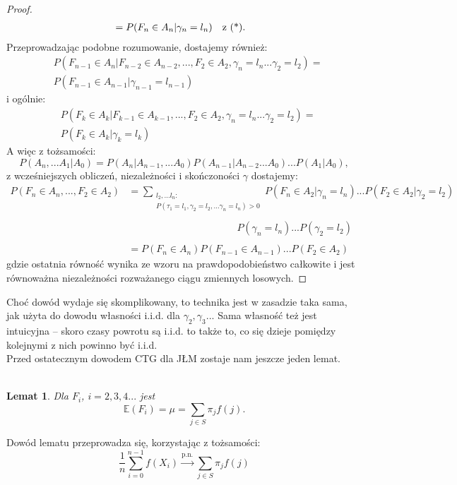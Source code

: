 \documentclass[a4paper]{article}
\theoremstyle{defn}
\theoremstyle{theorem}
\theoremstyle{lemma}
\newtheorem{lemma}[defn]{Lemat}
\theoremstyle{cor}
\theoremstyle{fact}
\begin{document}
\begin{proof}
\begin{align*}
    &= P(F_n \in A_n | \gamma_n = l_n) \text{\quad z (*).}
\end{align*}
Przeprowadzając podobne rozumowanie, dostajemy również:
\begin{align*}
&P(F_{n-1} \in A_n|F_{n-2} \in A_{n-2},  ..., F_2 \in A_2, \gamma_n = l_n ... \gamma_2 = l_2) =\\ & P(F_{n-1} \in A_{n-1} | \gamma_{n-1} = l_{n-1})
\end{align*}
i ogólnie:
\begin{align*}
&P(F_{k} \in A_k|F_{k-1} \in A_{k-1},  ..., F_2 \in A_2, \gamma_n = l_n ... \gamma_2 = l_2) =\\ & P(F_{k} \in A_{k} | \gamma_{k} = l_{k})
\end{align*}
A więc z tożsamości:
$$P(A_n, ... A_1|A_0) = P(A_n|A_{n-1}, ...A_0)P(A_{n-1}|A_{n-2}...A_0)...P(A_1|A_0),$$
z wcześniejszych obliczeń, niezależności i skończoności $\gamma$ dostajemy:
\begin{align*}
    P(F_n \in A_n, ..., F_2 \in A_2) &= \sum\limits_{\substack{l_2, ... l_n:\\P(\tau_1 = l_1, \gamma_2 = l_2, ... \gamma_n = l_n) > 0}} P(F_n \in A_2|\gamma_n = l_n) ... P(F_2 \in A_2|\gamma_2 = l_2)\\\\
    &\quad\quad\quad\quad\quad\quad\quad\quad\quad\quad\quad P(\gamma_n = l_n) ... P(\gamma_2 = l_2)\\\\
    &= P(F_n \in A_n)P(F_{n-1} \in A_{n-1}) ... P(F_2 \in A_2)
\end{align*}
gdzie ostatnia równość wynika ze wzoru na prawdopodobieństwo całkowite i jest równoważna niezależności rozważanego ciągu zmiennych losowych. 
\end{proof}
Choć dowód wydaje się skomplikowany, to technika jest w zasadzie taka sama, jak użyta do dowodu własności i.i.d. dla $\gamma_2, \gamma_3 ...$ Sama własność też jest intuicyjna – skoro czasy powrotu są i.i.d. to także to, co się dzieje pomiędzy kolejnymi z nich powinno być i.i.d.\\
Przed ostatecznym dowodem CTG dla JŁM zostaje nam jeszcze jeden lemat.\\
\\
\begin{lemma}\label{lemma2.6.4}
Dla $F_i$, $i=2,3,4...$ jest
$$\mathbb{E}(F_i) = \mu = \sum\limits_{j \in S} \pi_j f(j).$$
\end{lemma}
Dowód lematu przeprowadza się, korzystając z tożsamości:
$$ \frac{1}{n} \sum\limits_{i=0}^{n-1} f(X_i) \overset{\text{p.n.}}{\to} \sum\limits_{j \in S} \pi_j f(j)$$
\end{document}
